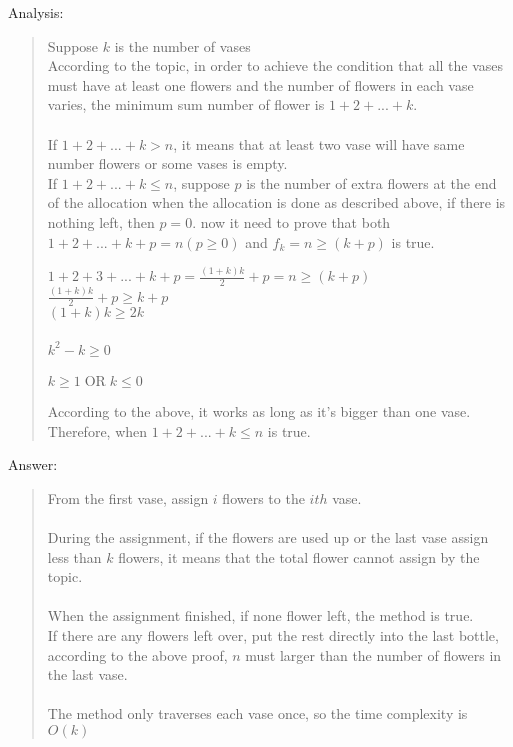 \documentclass{article}
\DeclareMathOperator{\OR}{OR}
\begin{document}
\begin{Question}
\begin{Subquestion}
\begin{answer}
Analysis:
\begin{quote}
    Suppose $k$ is the number of vases\\
    According to the topic, in order to achieve the condition that all the vases must have at least one flowers and the number of flowers in each vase varies, the minimum sum number of flower is $1 + 2 + ... + k$.\\\\
    If $1 + 2 + ... + k > n$, it means that at least two vase will have same number flowers or some vases is empty.\\
    If $1 + 2 + ... + k \leq n$, suppose $p$ is the number of extra flowers at the end of the allocation when the allocation is done as described above, if there is nothing left, then $p = 0$. now it need to prove that both $1 + 2 + ... + k + p = n (p \geq 0)$ and $f_k = n \geq (k + p)$ is true.
    \begin{center}
        \setlength{\baselineskip}{20pt}
        $ 1 + 2 + 3 + ... + k + p = \displaystyle{\frac{(1+k)k}{2}} + p = n \geq (k + p)$\\
        $ \displaystyle{\frac{(1 + k) k}{2}} + p \geq k + p$\\
        $ {(1 + k ) k \geq 2k}$\\\\
        $ k^2 - k \geq 0$\\\\
        $ k \geq 1 \OR k \leq 0 $
    \end{center}
    According to the above, it works as long as it's bigger than one vase. Therefore, when $1 + 2 + ... + k \leq n$ is true.
\end{quote}
Answer:
\begin{quote}
    From the first vase, assign $i$ flowers to the $ith$ vase.\\\\
    During the assignment, if the flowers are used up or the last vase assign less than $k$ flowers, it means that the total flower cannot assign by the topic. \\\\
    When the assignment finished, if none flower left, the method is true. 
    \\If there are any flowers left over, put the rest directly into the last bottle, according to the above proof, $n$ must larger than the number of flowers in the last vase. \\\\
    The method only traverses each vase once, so the time complexity is $O(k)$\\
\end{quote}
\end{answer}
\end{Subquestion}


\end{Question}
\end{document}
